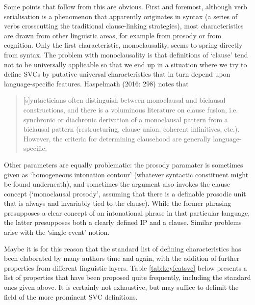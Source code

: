 Some points that follow from this are obvious. First and foremost, although verb serialisation is a phenomenon that apparently originates in syntax (a series of verbs crosscutting the traditional clause-linking strategies), most characteristics are drawn from other linguistic areas, for example from prosody or from cognition. Only the first characteristic, monoclausality, seems to spring directly from syntax. The problem with monoclausality is that definitions of `clause' tend not to be universally applicable so that we end up in a situation where we try to define SVCs by putative universal characteristics that in turn depend upon language-specific features. Haspelmath (2016: 298) notes that \begin{quote}[s]yntacticians often distinguish between monoclausal
and biclausal constructions, and there is a voluminous literature on clause fusion, i.e.
synchronic or diachronic derivation of a monoclausal pattern from a biclausal pattern
(restructuring, clause union, coherent infinitives, etc.). However, the criteria for
determining clausehood are generally language-specific.\end{quote}

Other parameters are equally problematic: the prosody paramater is sometimes given as `homogeneous intonation contour' (whatever syntactic constituent might be found underneath), and sometimes the argument also invokes the clause concept (`monoclausal prosody', assuming that there is a definable prosodic unit that is always and invariably tied to the clause). While the former phrasing presupposes a clear concept of an intonational phrase in that particular language, the latter presupposes both a clearly defined IP and a clause. Similar problems arise with the `single event' notion.

Maybe it is for this reason that the standard list of defining characteristics has been elaborated by many authors time and again, with the addition of further properties from different linguistic layers. Table \ref{tab:keyfeatsvc} below presents a list of properties that have been proposed quite frequently, including the standard ones given above. It is certainly not exhaustive, but may suffice to delimit the field of the more prominent SVC definitions.

